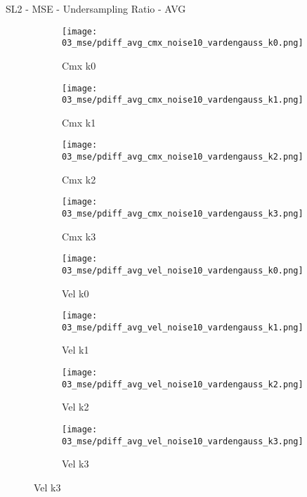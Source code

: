 \documentclass{beamer}
\begin{document}
\begin{frame}{SL2 - MSE - Undersampling Ratio - AVG}{}
\begin{figure}
\begin{subfigure}{0.24\textwidth}
\texttt{[image: 03\_mse/pdiff\_avg\_cmx\_noise10\_vardengauss\_k0.png]}
\vspace{-20pt}
\caption*{\tiny Cmx k0}
\end{subfigure}
\begin{subfigure}{0.24\textwidth}
\texttt{[image: 03\_mse/pdiff\_avg\_cmx\_noise10\_vardengauss\_k1.png]}
\vspace{-20pt}
\caption*{\tiny Cmx k1}
\end{subfigure}
\begin{subfigure}{0.24\textwidth}
\texttt{[image: 03\_mse/pdiff\_avg\_cmx\_noise10\_vardengauss\_k2.png]}
\vspace{-20pt}
\caption*{\tiny Cmx k2}
\end{subfigure}
\begin{subfigure}{0.24\textwidth}
\texttt{[image: 03\_mse/pdiff\_avg\_cmx\_noise10\_vardengauss\_k3.png]}
\vspace{-20pt}
\caption*{\tiny Cmx k3}
\end{subfigure}

\begin{subfigure}{0.24\textwidth}
\texttt{[image: 03\_mse/pdiff\_avg\_vel\_noise10\_vardengauss\_k0.png]}
\vspace{-20pt}
\caption*{\tiny Vel k0}
\end{subfigure}
\begin{subfigure}{0.24\textwidth}
\texttt{[image: 03\_mse/pdiff\_avg\_vel\_noise10\_vardengauss\_k1.png]}
\vspace{-20pt}
\caption*{\tiny Vel k1}
\end{subfigure}
\begin{subfigure}{0.24\textwidth}
\texttt{[image: 03\_mse/pdiff\_avg\_vel\_noise10\_vardengauss\_k2.png]}
\vspace{-20pt}
\caption*{\tiny Vel k2}
\end{subfigure}
\begin{subfigure}{0.24\textwidth}
\texttt{[image: 03\_mse/pdiff\_avg\_vel\_noise10\_vardengauss\_k3.png]}
\vspace{-20pt}
\caption*{\tiny Vel k3}
\end{subfigure}
\end{figure}
\end{frame}
\end{document}
